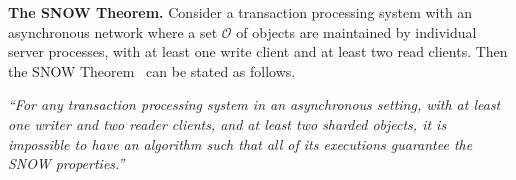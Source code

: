 {\bf The SNOW Theorem.}
\label{sec:snow}
Consider a transaction processing system with an asynchronous network where a set $\mathcal{O}$ of objects are maintained by individual server processes,  with at least one write client and at least two read clients. Then the SNOW Theorem~\cite{SNOW2016} can be stated as follows.



\emph{``For any transaction processing system in an asynchronous setting, with at least one writer and two reader clients, and at least two sharded objects, it is impossible to have an algorithm such that all of its executions guarantee the SNOW properties.''} %


